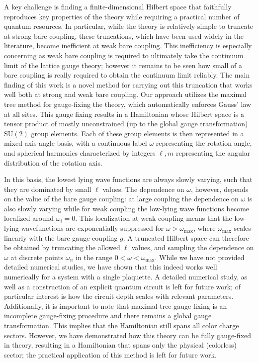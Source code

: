 \documentclass[reprint,superscriptaddress,pra,nofootinbib,preprintnumbers,floatfix]{revtex4-1}
\providecommand{\sutwo}{$\mathrm{SU}(2)$\xspace}
\begin{document}
A key challenge is finding a finite-dimensional Hilbert space that faithfully reproduces key properties of the theory while requiring a practical number of quantum resources.
%
In particular, while the theory is relatively simple to truncate at strong bare coupling, these truncations, which have been used widely in the literature, become inefficient at weak bare coupling. 
%
This inefficiency is especially concerning as weak bare coupling is required to ultimately take the continuum limit of the lattice gauge theory; however it remains to be seen how small of a bare coupling is really required to obtain the continuum limit reliably.
%
The main finding of this work is a novel method for carrying out this truncation that works well both at strong and weak bare coupling. 
%
Our approach utilizes the maximal tree method for gauge-fixing the theory, which automatically enforces Gauss' law at all sites.
%
This gauge fixing results in a Hamiltonian whose Hilbert space is a tensor product of mostly unconstrained (up to the global gauge transformation) \sutwo group elements.
%
Each of these group elements is then represented in a mixed axis-angle  basis, with a continuous label $\omega$ representing the rotation angle, and spherical harmonics characterized by integers $\ell, m$ representing the angular distribution of the rotation axis.

%
In this basis, the lowest lying wave functions are always slowly varying, such that they are dominated by small $\ell$ values. 
%
The dependence on $\omega$, however, depends on the value of the bare gauge coupling: at large coupling the dependence on $\omega$ is also slowly varying while for weak coupling the low-lying wave functions become localized around $\omega_i = 0$. This localization at weak coupling means that the low-lying wavefunctions are exponentially suppressed for $\omega > \omega_{\max}$, where $\omega_{\max}$ scales linearly with the bare gauge coupling $g$. 
%
A truncated Hilbert space can therefore be obtained by truncating the allowed $\ell$ values, and sampling the dependence on $\omega$ at discrete points $\omega_n$  in the range $0 < \omega < \omega_{\max}$. 
%
While we have not provided detailed numerical studies, we have shown that this indeed works well numerically for a system with a single plaquette.
%
A detailed numerical study, as well as a construction of an explicit quantum circuit is left for future work; of particular interest is how the circuit depth scales with relevant parameters.
%
Additionally, it is important to note that maximal-tree gauge fixing is an  incomplete gauge-fixing procedure and there remains a global gauge transformation. This implies that the Hamiltonian still spans all color charge sectors.  However, we have demonstrated how this theory can be fully gauge-fixed in theory, resulting in a Hamiltonian that spans only the physical (colorless) sector; the practical application of this method is left for future work. 
\end{document}

